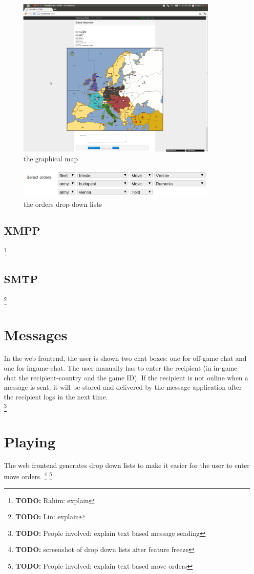 \documentclass[11pt,a4paper]{report}
\newcommand{\todo}[1]{\footnote{{\color{red} {\bf TODO:} #1}}}
\begin{document}
\begin{figure}[h]
 \centering
 \includegraphics[width=10cm]{./graphics/graphicalmap.png}
 \caption{the graphical map}
 \label{fig:map}
\end{figure}

\begin{figure}[h]
 \centering
 \includegraphics[width=10cm]{./graphics/orderssmall.png}
 \caption{the orders drop-down lists}
 \label{fig:orders}
\end{figure}


\subsection{XMPP}
\todo{Rahim: explain}
\subsection{SMTP}
\todo{Lin: explain}
\section{Messages}
In the web frontend, the user is shown two chat boxes: one for off-game chat
and one for ingame-chat. The user manually has to enter the recipient (in
in-game chat the recipient-country and the game ID). If the recipient is not
online when a message is sent, it will be stored and delivered by the message
application after the recipient logs in the next time. \\
\todo{People involved: explain text based message sending}

\section{Playing}
The web frontend generates drop down lists to make it easier for the user to
enter move orders. \todo{screenshot of drop down lists after feature freeze}
\todo{People involved: explain text based move orders}.
\end{document}
